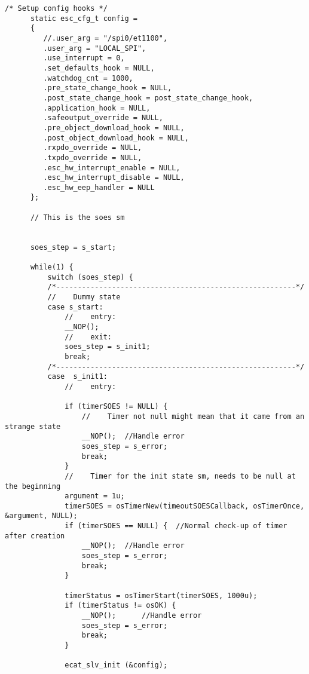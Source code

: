 \begin{lstlisting}[label=lst:soesAPP DSM,caption={Source code for SOES APP DSM}]
      /* Setup config hooks */
      static esc_cfg_t config =
      {
         //.user_arg = "/spi0/et1100",
         .user_arg = "LOCAL_SPI",
         .use_interrupt = 0,
         .set_defaults_hook = NULL,
         .watchdog_cnt = 1000,
         .pre_state_change_hook = NULL,
         .post_state_change_hook = post_state_change_hook,
         .application_hook = NULL,
         .safeoutput_override = NULL,
         .pre_object_download_hook = NULL,
         .post_object_download_hook = NULL,
         .rxpdo_override = NULL,
         .txpdo_override = NULL,
         .esc_hw_interrupt_enable = NULL,
         .esc_hw_interrupt_disable = NULL,
         .esc_hw_eep_handler = NULL
      };
   
      // This is the soes sm
   
   
      soes_step = s_start;
   
      while(1) {
          switch (soes_step) {
          /*--------------------------------------------------------*/
          //	Dummy state
          case s_start:
              //	entry:
              __NOP();
              //	exit:
              soes_step = s_init1;
              break;
          /*--------------------------------------------------------*/
          case  s_init1:
              //	entry:
   
              if (timerSOES != NULL) {
                  //	Timer not null might mean that it came from an strange state
                  __NOP();	//Handle error
                  soes_step = s_error;
                  break;
              }
              //	Timer for the init state sm, needs to be null at the beginning
              argument = 1u;
              timerSOES = osTimerNew(timeoutSOESCallback, osTimerOnce, &argument, NULL);
              if (timerSOES == NULL) {	//Normal check-up of timer after creation
                  __NOP();	//Handle error
                  soes_step = s_error;
                  break;
              }
   
              timerStatus = osTimerStart(timerSOES, 1000u);
              if (timerStatus != osOK) {
                  __NOP();		//Handle error
                  soes_step = s_error;
                  break;
              }
   
              ecat_slv_init (&config);
   

\end{lstlisting}
